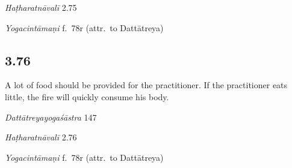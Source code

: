 \begin{ekdosis}
\begin{testimonia}[hp03_075]
\emph{Haṭharatnāvalī} 2.75
\begin{versinnote}
\end{versinnote}

\emph{Yogacintāmaṇi} f.~78r (attr.~to Dattātreya)
\begin{versinnote}
\end{versinnote}
\end{testimonia}



\subsection*{3.76}
\begin{translation}[hp03_076]
A lot of food should be provided for the practitioner. If the practitioner eats little, the fire will quickly consume his body.
\end{translation}

\begin{sources}[hp03_076]
\emph{Dattātreyayogaśāstra} 147
\begin{versinnote}
\end{versinnote}
\end{sources}

\begin{testimonia}[hp03_076]

\emph{Haṭharatnāvalī} 2.76
\begin{versinnote}
\end{versinnote}

\emph{Yogacintāmaṇi} f.~78r (attr.~to Dattātreya)
\begin{versinnote}
\end{versinnote}


\end{testimonia}
\end{ekdosis}
